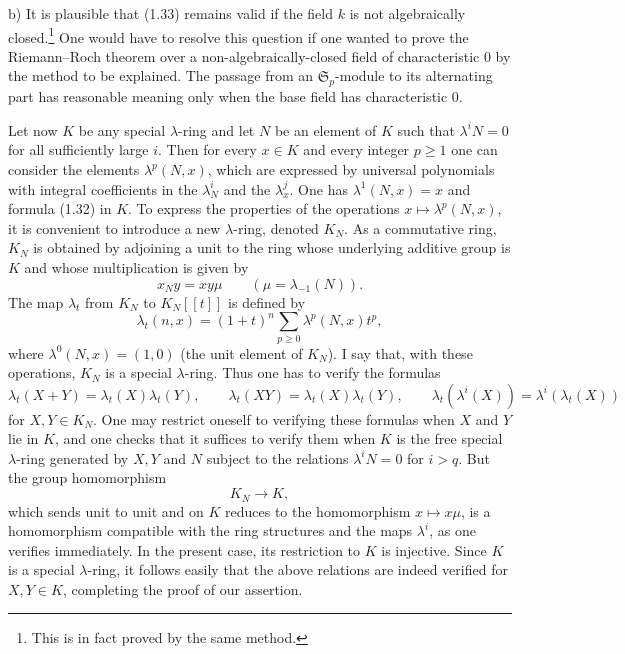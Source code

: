 b) It is plausible that (1.33) remains valid if the field $k$ is not algebraically closed.\footnote{This is in fact proved by the same method.} One would have to resolve this question if one wanted to prove the Riemann--Roch theorem over a non-algebraically-closed field of characteristic $0$ by the method to be explained. The passage from an $\mathfrak S_p$-module to its alternating part has reasonable meaning only when the base field has characteristic $0$.

Let now $K$ be any special $\lambda$-ring and let $N$ be an element of $K$ such that $\lambda^iN=0$ for all sufficiently large $i$. Then for every $x\in K$ and every integer $p\geq 1$ one can consider the elements $\lambda^p(N,x)$, which are expressed by universal polynomials with integral coefficients in the $\lambda_N^i$ and the $\lambda_x^j$. One has $\lambda^1(N,x)=x$ and formula (1.32) in $K$. To express the properties of the operations $x\mapsto\lambda^p(N,x)$, it is convenient to introduce a new $\lambda$-ring, denoted $K_N$. As a commutative ring, $K_N$ is obtained by adjoining a unit to the ring whose underlying additive group is $K$ and whose multiplication is given by
\begin{equation}\tag{1.34}
x_Ny=xy\mu\qquad(\mu=\lambda_{-1}(N)).
\end{equation}
The map $\lambda_t$ from $K_N$ to $K_N[[t]]$ is defined by
\begin{equation}\tag{1.35}
\lambda_t(n,x)=(1+t)^n\sum_{p\geq 0}\lambda^p(N,x)t^p,
\end{equation}
where $\lambda^0(N,x)=(1,0)$ (the unit element of $K_N$). I say that, with these operations, $K_N$ is a special $\lambda$-ring. Thus one has to verify the formulas
\[
\lambda_t(X+Y)=\lambda_t(X)\lambda_t(Y),\qquad
\lambda_t(XY)=\lambda_t(X)\lambda_t(Y),\qquad
\lambda_t(\lambda^i(X))=\lambda^i(\lambda_t(X))
\]
for $X,Y\in K_N$. One may restrict oneself to verifying these formulas when $X$ and $Y$ lie in $K$, and one checks that it suffices to verify them when $K$ is the free special $\lambda$-ring generated by $X,Y$ and $N$ subject to the relations $\lambda^iN=0$ for $i>q$. But the group homomorphism
\begin{equation}\tag{1.36}
K_N\longrightarrow K,
\end{equation}
which sends unit to unit and on $K$ reduces to the homomorphism $x\mapsto x\mu$, is a homomorphism compatible with the ring structures and the maps $\lambda^i$, as one verifies immediately. In the present case, its restriction to $K$ is injective. Since $K$ is a special $\lambda$-ring, it follows easily that the above relations are indeed verified for $X,Y\in K$, completing the proof of our assertion.

